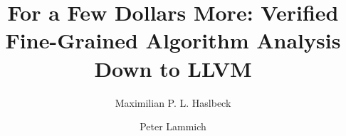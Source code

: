 \documentclass[acmsmall]{acmart}
\begin{document}
\title[For a Few Dollars More]{For a Few Dollars More: Verified Fine-Grained Algorithm Analysis Down to {LLVM}}

\author{Maximilian P. L. Haslbeck}

\author{Peter Lammich}

\renewcommand{\shortauthors}{Haslbeck and Lammich}
\end{document}
